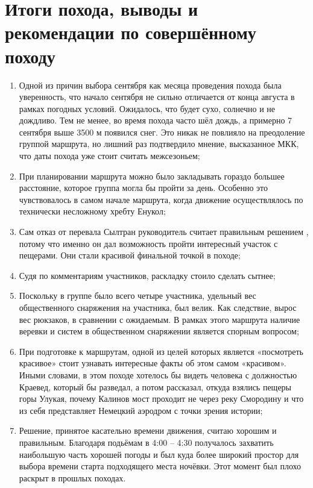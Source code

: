 \section{Итоги похода, выводы и рекомендации по совершённому походу}

	\begin{enumerate}
		\item Одной из причин выбора сентября как месяца проведения похода была уверенность, что начало сентября не сильно отличается от конца августа в рамках погодных условий. Ожидалось, что будет сухо, солнечно и не дождливо. Тем не менее, во время похода часто шёл дождь, а примерно 7 сентября выше 3500 м появился снег. Это никак не повлияло на преодоление группой маршрута, но лишний раз подтвердило мнение, высказанное МКК, что даты похода уже стоит считать межсезоньем; %
		\item ﻿﻿﻿При планировании маршрута можно было закладывать гораздо большее расстояние, которое группа могла бы пройти за день. Особенно это чувствовалось в самом начале маршрута, когда движение осуществлялось по технически несложному хребту Енукол;
		\item ﻿﻿﻿Сам отказ от перевала Сылтран руководитель считает правильным решением %
		, потому что именно он дал возможность пройти интересный участок с пещерами. Они стали красивой финальной точкой в походе;
		\item ﻿﻿﻿Судя по комментариям участников, раскладку стоило сделать сытнее;
		﻿\item ﻿﻿Поскольку в группе было всего четыре участника, удельный вес общественного снаряжения на участника, был велик. Как следствие, вырос вес рюкзаков, в сравнении с ожидаемым. В рамках этого маршрута наличие веревки и систем %
		в общественном снаряжении является спорным вопросом;
		\item ﻿﻿﻿При подготовке к маршрутам, одной из целей которых является «посмотреть красивое» стоит узнавать интересные факты об этом самом «красивом». Иными словами, в этом походе хотелось бы видеть человека с должностью Краевед, который бы разведал, а потом рассказал, откуда взялись пещеры горы Улукая, почему Калинов мост проходит не через реку Смородину и что из себя представляет Немецкий аэродром с точки зрения истории;
		\item ﻿﻿﻿Решение, принятое касательно времени движения, считаю хорошим и правильным. Благодаря подьёмам в 4:00 -- 4:30 получалось захватить наибольшую часть хорошей погоды и был куда более широкий простор для выбора времени старта подходящего места ночёвки. Этот момент был плохо раскрыт в прошлых походах. %
		
	\end{enumerate} 

	\clearpage